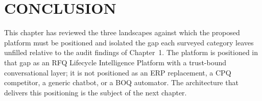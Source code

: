 \section*{CONCLUSION}
This chapter has reviewed the three landscapes against which the proposed platform must be positioned and isolated the gap each surveyed category leaves unfilled relative to the audit findings of Chapter~1. The platform is positioned in that gap as an RFQ Lifecycle Intelligence Platform with a trust-bound conversational layer; it is not positioned as an ERP replacement, a CPQ competitor, a generic chatbot, or a BOQ automator. The architecture that delivers this positioning is the subject of the next chapter.